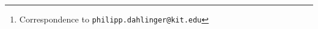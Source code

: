 \author{
  \textbf{Philipp Dahlinger}$^1$\thanks{Correspondence to \texttt{philipp.dahlinger@kit.edu}} %
  \And Balázs Gyenes$^1$ %
  \And Niklas Freymuth$^1$ %
  \And Luca Geminiani$^2$ %
  \And Tobias Würth$^3$ %
  \And Johannes Mitsch$^3$ %
  \And Nadja Klein$^2$ %
  \And Luise Kärger$^3$ %
  \And Gerhard Neumann$^1$
  \AND
  \normalfont $^1$Autonomous Learning Robots, $^2$Methods for Big Data, $^3$Institute of Vehicle System Technology \\
  Karlsruhe Institute of Technology, Karlsruhe
}

